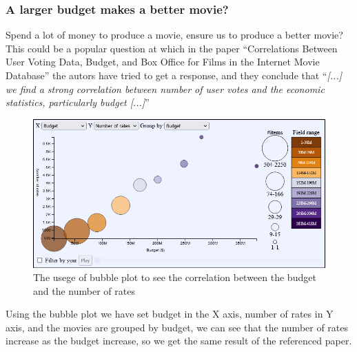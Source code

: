 \documentclass[]{article}
\newcommand{\quotes}[1]{``#1''}
\begin{document}
\subsubsection{A larger budget makes a better movie?}
Spend a lot of money to produce a movie, ensure us to produce a better movie? This could be a popular question at which in the paper \quotes{Correlations Between User Voting Data, Budget, and Box Office for Films in the Internet Movie Database} the autors have tried to get a response, and they conclude that \quotes{\emph{[...] we find a strong correlation between number of user votes and the economic statistics, particularly budget [...]}}
\begin{figure}[H]
	\centering
	\includegraphics[width=1\linewidth]{images/insigth_budget}
	\caption{The usege of bubble plot to see the correlation between the budget and the number of rates}
	\label{fig:insigthbudget}
\end{figure}
Using the bubble plot we have set budget in the X axis, number of rates in Y axis, and the movies are grouped by budget, we can see that the number of rates increase as the budget increase, so we get the same result of the referenced paper.
\end{document}

